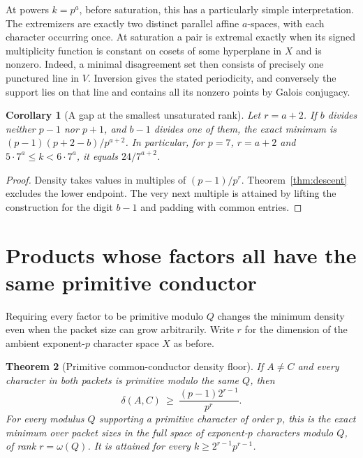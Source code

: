 \documentclass[11pt,letterpaper]{article}
\newtheorem{theorem}{Theorem}[section]
\newtheorem{corollary}[theorem]{Corollary}
\theoremstyle{remark}
\begin{document}
At powers $k=p^a$, before saturation, this has a particularly simple
interpretation. The extremizers are exactly two distinct parallel affine
$a$-spaces, with each character occurring once. At saturation a pair is
extremal exactly when its signed multiplicity function is constant on
cosets of some hyperplane in $X$ and is nonzero. Indeed, a minimal
disagreement set then consists of precisely one punctured line in $V$.
Inversion gives the stated periodicity, and conversely the support lies
on that line and contains all its nonzero points by Galois conjugacy.

\begin{corollary}[A gap at the smallest unsaturated rank]\label{cor:gaplift}
Let $r=a+2$. If $b$ divides neither $p-1$ nor $p+1$, and $b-1$ divides
one of them, the exact minimum is $(p-1)(p+2-b)/p^{a+2}$.
In particular, for $p=7$, $r=a+2$ and
$5\cdot 7^a\le k<6\cdot 7^a$, it equals $24/7^{a+2}$.
\end{corollary}

\begin{proof}
Density takes values in multiples of $(p-1)/p^r$.
Theorem~\ref{thm:descent} excludes the lower endpoint. The very next
multiple is attained by lifting the construction for the digit $b-1$
and padding with common entries.
\end{proof}
\section{Products whose factors all have the same primitive conductor}
\label{sec:primitive}

Requiring every factor to be primitive modulo $Q$ changes the
minimum density even when the packet size can grow arbitrarily.
Write $r$ for the dimension of the ambient exponent-$p$ character space
$X$ as before.

\begin{theorem}[Primitive common-conductor density floor]\label{thm:primitive}
If $A\ne C$ and every character in both packets is primitive modulo the same $Q$, then
\[
 \delta(A,C)\ \ge\ \frac{(p-1)2^{r-1}}{p^r}.
\]
For every modulus $Q$ supporting a primitive character of order $p$,
this is the exact minimum over packet sizes in the full space of
exponent-$p$ characters modulo $Q$, of rank $r=\omega(Q)$. It is
attained for every $k\ge2^{r-1}p^{r-1}$.
\end{theorem}
\end{document}
